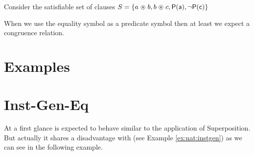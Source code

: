 Consider the satisfiable set of clauses $S = \{a \mathrel{\circledast} b, b \mathrel{\circledast} c, {\mathsf P}({\mathsf a}), \lnot {\mathsf P}({\mathsf c}) \}$

When we use the equality symbol as a predicate symbol 
then at least we expect a congruence relation.

\section{Examples}


\section{Inst-Gen-Eq}

At a first glance \InstGenEQ is expected to behave similar to the application of Superposition. 
But actually it shares a disadvantage with \InstGen (see Example \ref{ex:nat:instgen}) as we can see in the following example.


